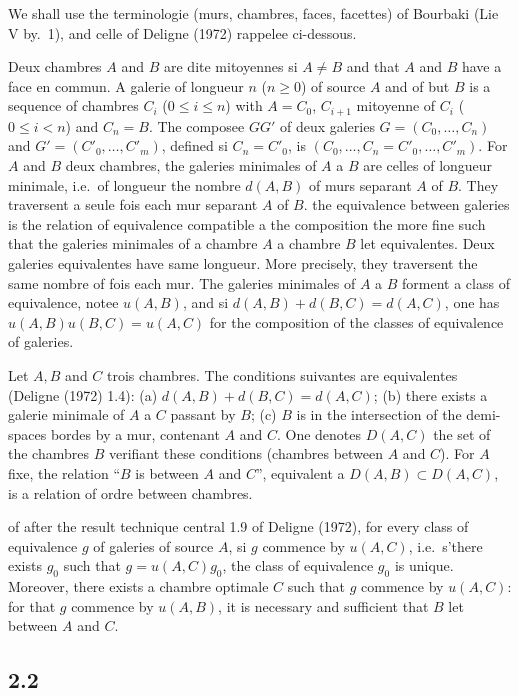 \documentclass[11pt,a4paper]{article}
\theoremstyle{plain}
\theoremstyle{definition}
\begin{document}
We shall use the terminologie (murs, chambres, faces, facettes) of Bourbaki (Lie V by.~1), and celle of Deligne (1972) rappelee ci-dessous.

Deux chambres $A$ and $B$ are dite mitoyennes si $A \not= B$ and that $A$ and $B$ have a face en commun. A galerie of longueur $n$ ($n \geq 0$) of source $A$ and of but $B$ is a sequence of chambres $C_i$ ($0 \leq i \leq n$) with $A = C_0$, $C_{i+1}$ mitoyenne of $C_i$ ($0 \leq i < n$) and $C_n = B$. The composee $GG'$ of deux galeries $G = (C_0, \ldots, C_n)$ and $G' = (C'_0, \ldots, C'_m)$, defined si $C_n = C'_0$, is $(C_0, \ldots, C_n = C'_0, \ldots, C'_m)$. For $A$ and $B$ deux chambres, the galeries minimales of $A$ a $B$ are celles of longueur minimale, i.e.\ of longueur the nombre $d(A,B)$ of murs separant $A$ of $B$. They traversent a seule fois each mur separant $A$ of $B$. the equivalence between galeries is the relation of equivalence compatible a the composition the more fine such that the galeries minimales of a chambre $A$ a chambre $B$ let equivalentes. Deux galeries equivalentes have same longueur. More precisely, they traversent the same nombre of fois each mur. The galeries minimales of $A$ a $B$ forment a class of equivalence, notee $u(A,B)$, and si $d(A,B) + d(B,C) = d(A,C)$, one has $u(A,B) u(B,C) = u(A,C)$ for the composition of the classes of equivalence of galeries.

Let $A, B$ and $C$ trois chambres. The conditions suivantes are equivalentes (Deligne (1972) 1.4): (a) $d(A,B) + d(B,C) = d(A,C)$; (b) there exists a galerie minimale of $A$ a $C$ passant by $B$; (c) $B$ is in the intersection of the demi-spaces bordes by a mur, contenant $A$ and $C$. One denotes $D(A,C)$ the set of the chambres $B$ verifiant these conditions (chambres between $A$ and $C$). For $A$ fixe, the relation ``$B$ is between $A$ and $C$'', equivalent a $D(A,B) \subset D(A,C)$, is a relation of ordre between chambres.

of after the result technique central 1.9 of Deligne (1972), for every class of equivalence $g$ of galeries of source $A$, si $g$ commence by $u(A,C)$, i.e.\ s'there exists $g_0$ such that $g = u(A,C) g_0$, the class of equivalence $g_0$ is unique. Moreover, there exists a chambre optimale $C$ such that $g$ commence by $u(A,C)$: for that $g$ commence by $u(A,B)$, it is necessary and sufficient that $B$ let between $A$ and $C$.

\subsection*{2.2}
\end{document}
